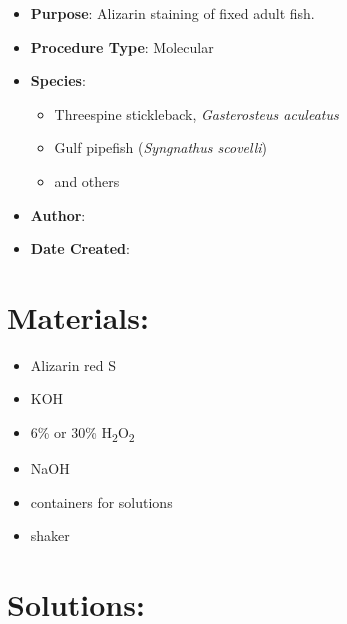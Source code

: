 \documentclass[
  letterpaper,
  DIV=11,
  numbers=noendperiod]{scrreprt}
\providecommand{\tightlist}{%
  \setlength{\itemsep}{0pt}\setlength{\parskip}{0pt}}\usepackage{longtable,booktabs,array}
\begin{document}
\begin{itemize}
\tightlist
\item
  \textbf{Purpose}: Alizarin staining of fixed adult fish.
\item
  \textbf{Procedure Type}: Molecular
\item
  \textbf{Species}:

  \begin{itemize}
  \tightlist
  \item
    Threespine stickleback, \emph{Gasterosteus aculeatus}
  \item
    Gulf pipefish (\emph{Syngnathus scovelli})
  \item
    and others
  \end{itemize}
\item
  \textbf{Author}:
\item
  \textbf{Date Created}:
\end{itemize}

\hypertarget{materials-15}{%
\section{Materials:}\label{materials-15}}

\begin{itemize}
\tightlist
\item
  Alizarin red S
\item
  KOH
\item
  6\% or 30\% H\textsubscript{2}O\textsubscript{2}
\item
  NaOH
\item
  containers for solutions
\item
  shaker
\end{itemize}

\hypertarget{solutions-15}{%
\section{Solutions:}\label{solutions-15}}
\end{document}

